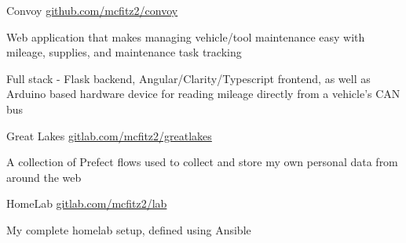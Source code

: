 

\begin{cventries}

  \cventry
    {} %
    {Convoy} %
    {\href{https://github.com/mcfitz2/convoy}{github.com/mcfitz2/convoy}} %
    {} %
    {
      \begin{cvitems} %
        \item {Web application that makes managing vehicle/tool maintenance easy with mileage, supplies, and maintenance task tracking}
        \item {Full stack - Flask backend, Angular/Clarity/Typescript frontend, as well as Arduino based hardware device for reading mileage directly from a vehicle's CAN bus}
      \end{cvitems}
    }

  \cventry
    {} %
    {Great Lakes} %
    {\href{https://gitlab.com/mcfitz2/lab/-/tree/master/applications/greatlakes}{gitlab.com/mcfitz2/greatlakes}} %
    {} %
    {
      \begin{cvitems} %
        \item {A collection of Prefect flows used to collect and store my own personal data from around the web}
      \end{cvitems}
    }
  \cventry
    {} %
    {HomeLab} %
    {\href{https://gitlab.com/mcfitz2/lab}{gitlab.com/mcfitz2/lab}} %
    {} %
    {
      \begin{cvitems} %
        \item {My complete homelab setup, defined using Ansible}
      \end{cvitems}
    }

\end{cventries}
